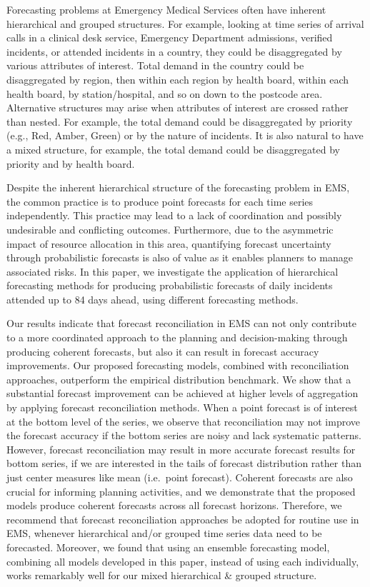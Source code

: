 \documentclass[
  authoryear,
  preprint,
  3p]{elsarticle}
\begin{document}
Forecasting problems at Emergency Medical Services often have inherent
hierarchical and grouped structures. For example, looking at time series
of arrival calls in a clinical desk service, Emergency Department
admissions, verified incidents, or attended incidents in a country, they
could be disaggregated by various attributes of interest. Total demand
in the country could be disaggregated by region, then within each region
by health board, within each health board, by station/hospital, and so
on down to the postcode area. Alternative structures may arise when
attributes of interest are crossed rather than nested. For example, the
total demand could be disaggregated by priority (e.g., Red, Amber,
Green) or by the nature of incidents. It is also natural to have a mixed
structure, for example, the total demand could be disaggregated by
priority and by health board.

Despite the inherent hierarchical structure of the forecasting problem
in EMS, the common practice is to produce point forecasts for each time
series independently. This practice may lead to a lack of coordination
and possibly undesirable and conflicting outcomes. Furthermore, due to
the asymmetric impact of resource allocation in this area, quantifying
forecast uncertainty through probabilistic forecasts is also of value as
it enables planners to manage associated risks. In this paper, we
investigate the application of hierarchical forecasting methods for
producing probabilistic forecasts of daily incidents attended up to 84
days ahead, using different forecasting methods.

Our results indicate that forecast reconciliation in EMS can not only
contribute to a more coordinated approach to the planning and
decision-making through producing coherent forecasts, but also it can
result in forecast accuracy improvements. Our proposed forecasting
models, combined with reconciliation approaches, outperform the
empirical distribution benchmark. We show that a substantial forecast
improvement can be achieved at higher levels of aggregation by applying
forecast reconciliation methods. When a point forecast is of interest at
the bottom level of the series, we observe that reconciliation may not
improve the forecast accuracy if the bottom series are noisy and lack
systematic patterns. However, forecast reconciliation may result in more
accurate forecast results for bottom series, if we are interested in the
tails of forecast distribution rather than just center measures like
mean (i.e.~point forecast). Coherent forecasts are also crucial for
informing planning activities, and we demonstrate that the proposed
models produce coherent forecasts across all forecast horizons.
Therefore, we recommend that forecast reconciliation approaches be
adopted for routine use in EMS, whenever hierarchical and/or grouped
time series data need to be forecasted. Moreover, we found that using an
ensemble forecasting model, combining all models developed in this
paper, instead of using each individually, works remarkably well for our
mixed hierarchical \& grouped structure.
\end{document}
